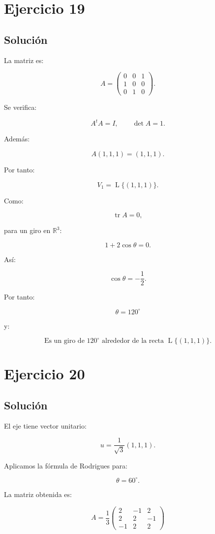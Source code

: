 \documentclass[11pt,a4paper]{article}
\newcommand{\R}{\mathbb{R}}
\newcommand{\tr}{\operatorname{tr}}
\newcommand{\Span}{\operatorname{L}}
\begin{document}
\section{Ejercicio 19}
\subsection{Solución}

La matriz es:

\[
A=
\begin{pmatrix}
0&0&1\\
1&0&0\\
0&1&0
\end{pmatrix}.
\]

Se verifica:

\[
A^tA=I,
\qquad
\det A=1.
\]

Además:

\[
A(1,1,1)=(1,1,1).
\]

Por tanto:

\[
V_1
=
\Span\{(1,1,1)\}.
\]

Como:

\[
\tr A=0,
\]

para un giro en \(\R^3\):

\[
1+2\cos\theta=0.
\]

Así:

\[
\cos\theta=-\frac12.
\]

Por tanto:

\[
\boxed{
\theta=120^\circ
}
\]

y:

\[
\boxed{
\text{Es un giro de }120^\circ
\text{ alrededor de la recta }
\Span\{(1,1,1)\}.
}
\]

\section{Ejercicio 20}
\subsection{Solución}

El eje tiene vector unitario:

\[
u=
\frac1{\sqrt3}(1,1,1).
\]

Aplicamos la fórmula de Rodrigues para:

\[
\theta=60^\circ.
\]

La matriz obtenida es:

\[
\boxed{
A=
\frac13
\begin{pmatrix}
2&-1&2\\
2&2&-1\\
-1&2&2
\end{pmatrix}
}
\]
\end{document}
